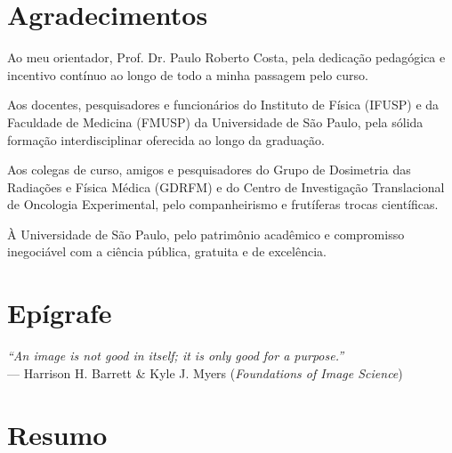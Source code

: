 \documentclass[
  12pt,
  a4paper,
  oneside
]{report}
\begin{document}
\chapter*{Agradecimentos}

Ao meu orientador, Prof. Dr. Paulo Roberto Costa, pela dedicação pedagógica e incentivo contínuo ao longo de todo a minha passagem pelo curso.

Aos docentes, pesquisadores e funcionários do Instituto de Física (IFUSP) e da Faculdade de Medicina (FMUSP) da Universidade de São Paulo, pela sólida formação interdisciplinar oferecida ao longo da graduação.

Aos colegas de curso, amigos e pesquisadores do Grupo de Dosimetria das Radiações e Física Médica (GDRFM) e do Centro de Investigação Translacional de Oncologia Experimental, pelo companheirismo e frutíferas trocas científicas.

À Universidade de São Paulo, pelo patrimônio acadêmico e compromisso inegociável com a ciência pública, gratuita e de excelência.
\clearpage

\chapter*{Epígrafe}
\vspace*{\fill}
\begin{flushright}
  \textit{``An image is not good in itself; it is only good for a purpose.''}\\
  \vspace{0.3cm}
  --- Harrison H. Barrett \& Kyle J. Myers (\emph{Foundations of Image Science})
\end{flushright}
\clearpage

\chapter*{Resumo}
\end{document}
